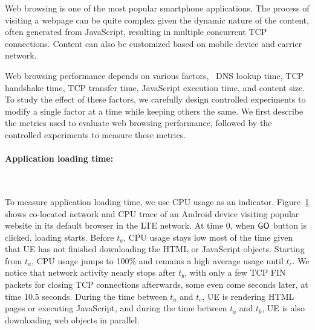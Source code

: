 Web browsing is one of the most popular smartphone applications. The 
process of visiting a webpage can be quite complex given the dynamic 
nature of the content, often generated from JavaScript, resulting in 
multiple concurrent TCP connections. Content can also be customized 
based on mobile device and carrier network.

Web browsing performance depends on various factors, \eg~DNS lookup 
time, TCP handshake time, TCP transfer time, JavaScript execution 
time, and content size. To study the effect of these factors, we 
carefully design controlled experiments to modify a single factor 
at a time while keeping others the same. We first describe the metrics 
used to evaluate web browsing performance, followed by the controlled 
experiments to measure these metrics.

\label{sec:app.web_metrics}

\paragraph{Application loading time:} 

\begin{figure}[t]
\centering
{}\\
\label{fig:cpu}
\end{figure}


To measure application loading time, we use CPU usage as an indicator. Figure~\ref{fig:cpu} shows co-located network and CPU trace of an Android device visiting popular website in its default browser in the LTE network. At time 0, when ${\sf GO}$ button is clicked, loading starts. Before $t_a$, CPU usage stays low most of the time given that UE has not finished downloading the HTML or JavaScript objects. Starting from $t_a$, CPU usage jumps to 100\% and remains a high average usage until $t_c$. We notice that network activity nearly stops after $t_b$, with only a few TCP {\sf FIN} packets for closing TCP connections afterwards, some even come seconds later, \eg at time 10.5 seconds. During the time between $t_a$ and $t_c$, UE is rendering HTML pages or executing JavaScript, and during the time between $t_a$ and $t_b$, UE is also downloading web objects in parallel.

